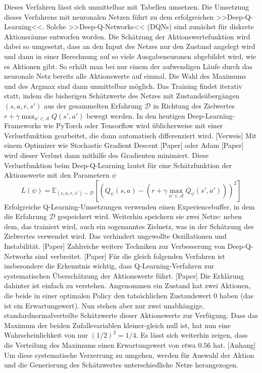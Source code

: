 Dieses Verfahren lässt sich unmittelbar mit Tabellen umsetzen.
Die Umsetzung dieses Verfahrens mit neuronalen Netzen führt zu dem erfolgreichen >>Deep-Q-Learning<<.
Solche >>Deep-Q-Networks<< (DQNs) sind zunächst für diskrete Aktionsräume entworfen worden.
Die Schätzung der Aktionswertefunktion wird dabei so umgesetzt, dass an den Input des Netzes nur den Zustand angelegt wird und dann in einer Berechnung auf so viele Ausgabeneuronen abgebildet wird, wie es Aktionen gibt.
So erhält man bei nur einem der aufwendigen Läufe durch das neuronale Netz bereits alle Aktionswerte auf einmal.
Die Wahl des Maximums und des Argmax sind dann unmittelbar möglich.
Das Training findet iterativ statt, indem die bisherigen Schätzwerte des Netzes mit Zustandsübergängen $(s, a, r, s')$ aus der gesammelten Erfahrung $\mathcal{D}$ in Richtung des Zielwertes $r+\gamma \max_{a'\in\mathcal{A}}{Q(s',a')}$ bewegt werden.
In den heutigen Deep-Learning-Frameworks wie PyTorch oder Tensorflow wird üblicherweise mit einer Verlustfunktion gearbeitet, die dann automatisch differenziert wird. [Verweis]
Mit einem Optimizer wie Stochastic Gradient Descent [Paper] oder Adam [Paper] wird dieser Verlust dann mithilfe des Gradienten minimiert.
Diese Verlustfunktion beim Deep-Q-Learning lautet für eine Schätzfunktion der Aktionswerte mit den Parametern $\psi$
\begin{equation}
    L(\psi) = \mathbb{E}_{(s, a, r, s')\sim\mathcal{D}}\left[\left(Q_\psi(s,a)-\left(r+\gamma \max_{a'\in\mathcal{A}}{Q_\psi(s',a')}\right)\right)^2\right]
\end{equation}
Erfolgreiche Q-Learning-Umsetzungen verwenden einen Experiencebuffer, in dem die Erfahrung $\mathcal{D}$ gespeichert wird.
Weiterhin speichern sie zwei Netze: neben dem, das trainiert wird, auch ein sogenanntes Zielnetz, was in der Schätzung des Zielwertes verwendet wird.
Das verhindert ungewollte Oszillationen und Instabilität. [Paper]
Zahlreiche weitere Techniken zur Verbesserung von Deep-Q-Networks sind verbreitet. [Paper]
Für die gleich folgenden Verfahren ist insbesondere die Erkenntnis wichtig, dass Q-Learning-Verfahren zur systematischen Überschätzung der Aktionswerte führt. [Paper]
Die Erklärung dahinter ist einfach zu verstehen.
Angenommen ein Zustand hat zwei Aktionen, die beide in einer optimalen Policy den tatsächlichen Zustandswert 0 haben (das ist ein Erwartungswert).
Nun stehen aber nur zwei unabhängige, standardnormalverteilte Schätzwerte dieser Aktionswerte zur Verfügung.
Dass das Maximum der beiden Zufallsvariablen kleiner-gleich null ist, hat nun eine Wahrscheinlichkeit von nur $(1/2)^2=1/4$.
Es lässt sich weiterhin zeigen, dass die Verteilung des Maximums einen Erwartungswert von etwa $0.56$ hat. [Anhang]
Um diese systematische Verzerrung zu umgehen, werden für Auswahl der Aktion und die Generierung des Schätzwertes unterschiedliche Netze herangezogen.

